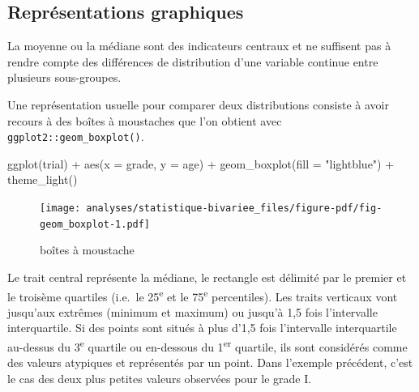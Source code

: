 \documentclass[
  letterpaper,
  DIV=11,
  numbers=noendperiod,
  oneside]{scrreprt}
\newenvironment{Shaded}{\begin{snugshade}}{\end{snugshade}}
\newcommand{\AttributeTok}[1]{\textcolor[rgb]{0.40,0.45,0.13}{#1}}
\newcommand{\FunctionTok}[1]{\textcolor[rgb]{0.28,0.35,0.67}{#1}}
\newcommand{\NormalTok}[1]{\textcolor[rgb]{0.00,0.23,0.31}{#1}}
\newcommand{\SpecialCharTok}[1]{\textcolor[rgb]{0.37,0.37,0.37}{#1}}
\newcommand{\StringTok}[1]{\textcolor[rgb]{0.13,0.47,0.30}{#1}}
\begin{document}
\hypertarget{repruxe9sentations-graphiques-1}{%
\subsection{Représentations
graphiques}\label{repruxe9sentations-graphiques-1}}

La moyenne ou la médiane sont des indicateurs centraux et ne suffisent
pas à rendre compte des différences de distribution d'une variable
continue entre plusieurs sous-groupes.

Une représentation usuelle pour comparer deux distributions consiste à
avoir recours à des boîtes à moustaches que l'on obtient avec
\texttt{ggplot2::geom\_boxplot()}.

\begin{Shaded}
\begin{Highlighting}[]
\FunctionTok{ggplot}\NormalTok{(trial) }\SpecialCharTok{+}
  \FunctionTok{aes}\NormalTok{(}\AttributeTok{x =}\NormalTok{ grade, }\AttributeTok{y =}\NormalTok{ age) }\SpecialCharTok{+}
  \FunctionTok{geom\_boxplot}\NormalTok{(}\AttributeTok{fill =} \StringTok{"lightblue"}\NormalTok{) }\SpecialCharTok{+}
  \FunctionTok{theme\_light}\NormalTok{()}
\end{Highlighting}
\end{Shaded}

\begin{figure}[H]

{\centering \texttt{[image: analyses/statistique-bivariee\_files/figure-pdf/fig-geom\_boxplot-1.pdf]}

}

\caption{\label{fig-geom_boxplot}boîtes à moustache}

\end{figure}

\begin{tcolorbox}[enhanced jigsaw, colbacktitle=quarto-callout-tip-color!10!white, opacityback=0, toprule=.15mm, colback=white, coltitle=black, bottomtitle=1mm, toptitle=1mm, titlerule=0mm, rightrule=.15mm, title=\textcolor{quarto-callout-tip-color}{\faLightbulb}\hspace{0.5em}{Astuce}, breakable, bottomrule=.15mm, opacitybacktitle=0.6, arc=.35mm, left=2mm, leftrule=.75mm, colframe=quarto-callout-tip-color-frame]

Le trait central représente la médiane, le rectangle est délimité par le
premier et le troisème quartiles (i.e.~le 25\textsuperscript{e} et le
75\textsuperscript{e} percentiles). Les traits verticaux vont jusqu'aux
extrêmes (minimum et maximum) ou jusqu'à 1,5 fois l'intervalle
interquartile. Si des points sont situés à plus d'1,5 fois l'intervalle
interquartile au-dessus du 3\textsuperscript{e} quartile ou en-dessous
du 1\textsuperscript{er} quartile, ils sont considérés comme des valeurs
atypiques et représentés par un point. Dans l'exemple précédent, c'est
le cas des deux plus petites valeurs observées pour le grade I.

\end{tcolorbox}
\end{document}
